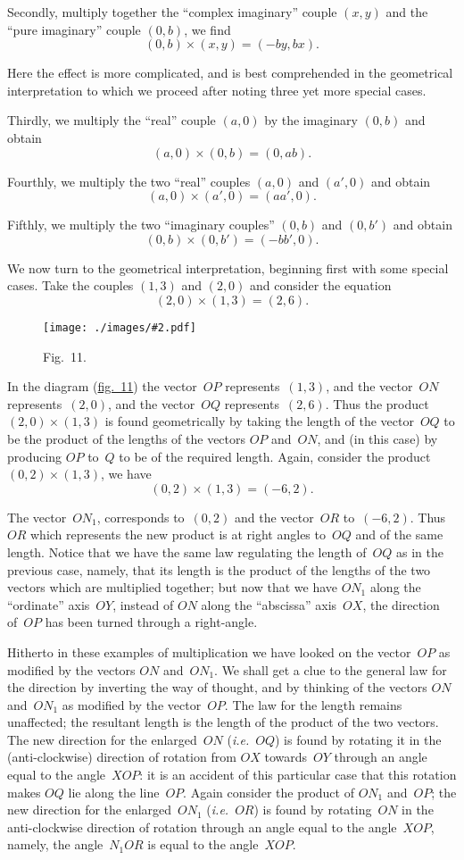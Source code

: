 \documentclass[12pt,leqno]{book}[2005/09/16]
\newcommand{\Typo}[2]{#2}
\newcommand{\Chg}[2]{#2}
\newcommand{\Add}[1]{\Chg{}{#1}}
\newcommand{\Graphic}[2]{%
  \phantomsection\label{fig:#2}%
  \texttt{[image: ./images/\#2.pdf]}%
}
\newcommand{\DefWidth}{4in}%
\newcommand{\Figure}[2][\DefWidth]{%
  \begin{figure}[hbt!]
    \centering
    \phantomsection\label{fig:#2}
    \Graphic{#1}{fig#2}
    \caption{Fig.~#2.}
  \end{figure}\ignorespaces%
}
\newcommand{\Fig}[2][Fig.]{\hyperref[fig:#2]{#1~#2}}
\newcommand{\PageSep}[1]{\ignorespaces}
\newcommand{\ie}{\emph{i.e.}}
\begin{document}
Secondly, multiply together the ``complex
imaginary'' couple $(x, y)$ and the ``pure
imaginary'' couple $(0, b)$, we find
\[
(0, b) × (x, y) = (-by, bx).
\]

Here the effect is more complicated, and is
best comprehended in the geometrical interpretation
to which we proceed after noting
three yet more special cases.

Thirdly, we multiply the ``real'' couple
$(a, 0)$ by the imaginary $(0, b)$ and obtain
\[
(a, 0) × (0, b) =(0, ab).
\]

Fourthly, we multiply the two ``real''
couples $(a, 0)$ and $(a', 0)$ and obtain
\[
(a, 0) × (a', 0) =( aa', 0).
\]

Fifthly, we multiply the two ``imaginary
couples'' $(0, b)$ and $(0, \Typo{b}{b'})$ and obtain
\[
(0, b) × (0, b') = (-bb', 0).
\]

We now turn to the geometrical interpretation,
beginning first with some special cases.
\PageSep{106}
Take the couples $(1, 3)$ and $(2, 0)$ and consider
the equation
\[
(2, 0) × (1, 3) = (2, 6)\Add{.}
\]
\Figure{11}

In the diagram (\Fig[fig.]{11}) the vector~$OP$ represents~$(1, 3)$,
and the vector~$ON$ represents~$(2, 0)$,
and the vector~$OQ$ represents~$(2, 6)$.
Thus the product $(2, 0) × (1, 3)$ is found geometrically
by taking the length of the vector~$OQ$
to be the product of the lengths of the
vectors $OP$ and~$ON$, and (in this case) by
producing $OP$ to~$Q$ to be of the required
length. Again, consider the product $(0, 2) × (1, 3)$,
we have
\[
(0, 2) × (1, 3) = (-6, 2)\Add{.}
\]

The vector~$ON_{1}$, corresponds to~$(0, 2)$ and
the vector~$OR$ to~$(-6,2)$. Thus $OR$ which
\PageSep{107}
represents the new product is at right angles
to~$OQ$ and of the same length. Notice that
we have the same law regulating the length
of~$OQ$ as in the previous case, namely, that
its length is the product of the lengths of
the two vectors which are multiplied together;
but now that we have $ON_{1}$ along the
``ordinate'' axis~$OY$, instead of $ON$ along
the ``abscissa'' axis~$OX$, the direction of~$OP$
has been turned through a right-angle.

Hitherto in these examples of multiplication
we have looked on the vector~$OP$ as modified
by the vectors $ON$ and~$ON_{1}$. We shall get
a clue to the general law for the direction by
inverting the way of thought, and by thinking
of the vectors $ON$ and~$ON_{1}$ as modified by
the vector~$OP$. The law for the length remains
unaffected; the resultant length is the
length of the product of the two vectors.
The new direction for the enlarged~$ON$ (\ie~$OQ$)
is found by rotating it in the (anti-clockwise)
direction of rotation from $OX$ towards~$OY$
through an angle equal to the angle~$XOP$:
it is an accident of this particular case that
this rotation makes $OQ$ lie along the line~$OP$.
Again consider the product of $ON_{1}$ and~$OP$;
the new direction for the enlarged~$ON_{1}$ (\ie~$OR$)
is found by rotating~$ON$ in the anti-clockwise
direction of rotation through an
angle equal to the angle~$XOP$, namely, the
angle~$N_{1}OR$ is equal to the angle~$XOP$.
\PageSep{108}
\end{document}
